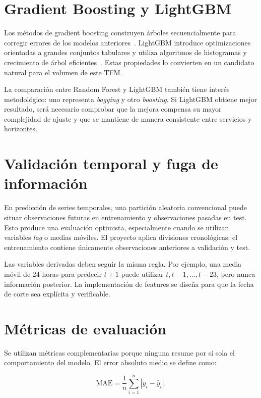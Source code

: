 \section{Gradient Boosting y LightGBM}

Los métodos de gradient boosting construyen árboles secuencialmente para corregir errores de los modelos anteriores~\cite{friedman2001}. LightGBM introduce optimizaciones orientadas a grandes conjuntos tabulares y utiliza algoritmos de histogramas y crecimiento de árbol eficientes~\cite{ke2017,lightgbm_docs}. Estas propiedades lo convierten en un candidato natural para el volumen de este TFM\@.

La comparación entre Random Forest y LightGBM también tiene interés metodológico: uno representa \textit{bagging} y otro \textit{boosting}. Si LightGBM obtiene mejor resultado, será necesario comprobar que la mejora compensa su mayor complejidad de ajuste y que se mantiene de manera consistente entre servicios y horizontes.

\section{Validación temporal y fuga de información}

En predicción de series temporales, una partición aleatoria convencional puede situar observaciones futuras en entrenamiento y observaciones pasadas en test. Esto produce una evaluación optimista, especialmente cuando se utilizan variables \textit{lag} o medias móviles. El proyecto aplica divisiones cronológicas: el entrenamiento contiene únicamente observaciones anteriores a validación y test.

Las variables derivadas deben seguir la misma regla. Por ejemplo, una media móvil de 24 horas para predecir \(t+1\) puede utilizar \(t,t-1,\ldots,t-23\), pero nunca información posterior. La implementación de features se diseña para que la fecha de corte sea explícita y verificable.

\section{Métricas de evaluación}

Se utilizan métricas complementarias porque ninguna resume por sí sola el comportamiento del modelo. El error absoluto medio se define como:

\begin{equation}
\mathrm{MAE}=\frac{1}{n}\sum_{i=1}^{n}\left|y_i-\hat{y}_i\right|.
\end{equation}


